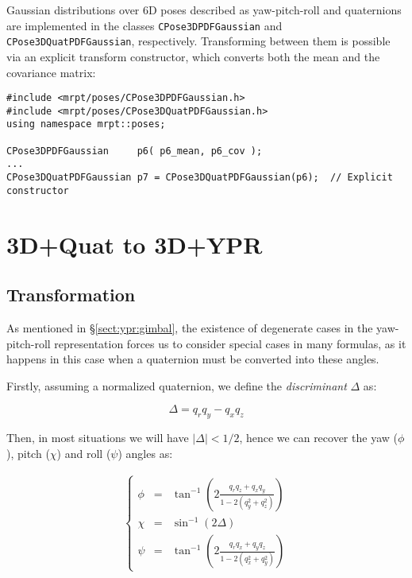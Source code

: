 \documentclass[a4paper,11pt]{report}
\begin{document}
Gaussian distributions over 6D poses described as yaw-pitch-roll and quaternions
are implemented in the classes \texttt{CPose3DPDFGaussian} and \texttt{CPose3DQuatPDFGaussian}, respectively.
Transforming between them is possible via an explicit transform constructor, which
converts both the mean and the covariance matrix:

\begin{lstlisting}
#include <mrpt/poses/CPose3DPDFGaussian.h>
#include <mrpt/poses/CPose3DQuatPDFGaussian.h>
using namespace mrpt::poses;

CPose3DPDFGaussian     p6( p6_mean, p6_cov );
...
CPose3DQuatPDFGaussian p7 = CPose3DQuatPDFGaussian(p6);  // Explicit constructor
\end{lstlisting}


\section{3D+Quat to 3D+YPR  }

\subsection{Transformation}

As mentioned in \S \ref{sect:ypr:gimbal}, the existence of degenerate cases in
the yaw-pitch-roll representation forces us to consider special cases in many formulas,
as it happens in this case when a quaternion must be converted into these angles.

Firstly, assuming a normalized quaternion, we define the \emph{discriminant} $\Delta$ as:

\begin{equation}
 \Delta = q_r q_y - q_x q_z
\end{equation}

Then, in most situations we will have $|\Delta|<1/2$, hence we can recover the
yaw ($\phi$),
pitch ($\chi$) and roll ($\psi$) angles as:

\begin{eqnarray}
\left\{
\begin{array}{rcl}
 \phi &=& \tan^{-1} \left( 2 \frac{q_r q_z + q_x q_y}{1-2(q_y^2+q_z^2)}  \right) \nonumber \\
 \chi &=& \sin^{-1} \left( 2 \Delta \right) \label{eq:quat2ypr_1} \\
 \psi &=& \tan^{-1} \left( 2 \frac{q_r q_x + q_y q_z}{1-2(q_x^2+q_y^2)}  \right) \nonumber
\end{array}
\right.
\end{eqnarray}
\end{document}

